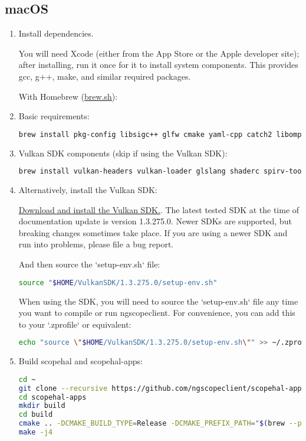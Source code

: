 \subsection{macOS}
\begin{enumerate}

\item Install dependencies.

You will need Xcode (either from the App Store or the Apple developer site); after installing, run it once for it
to install system components. This provides gcc, g++, make, and similar required packages.

With Homebrew (\href{https://brew.sh}{brew.sh}):

\item Basic requirements:
\begin{lstlisting}[language=sh, numbers=none]
brew install pkg-config libsigc++ glfw cmake yaml-cpp catch2 libomp hidapi libpng
\end{lstlisting}

\item Vulkan SDK components (skip if using the Vulkan SDK):
\begin{lstlisting}[language=sh, numbers=none]
brew install vulkan-headers vulkan-loader glslang shaderc spirv-tools molten-vk
\end{lstlisting}

\item Alternatively, install the Vulkan SDK:

 \href{https://vulkan.lunarg.com/sdk/home}{Download and install the Vulkan SDK.}.
The latest tested SDK at the time of documentation update is version 1.3.275.0. Newer SDKs are supported, but breaking
changes sometimes take place.
If you are using a newer SDK and run into problems, please file a bug report.

And then source the `setup-env.sh` file:
\begin{lstlisting}[language=sh, numbers=none]
source "$HOME/VulkanSDK/1.3.275.0/setup-env.sh"
\end{lstlisting}

When using the SDK, you will need to source the `setup-env.sh` file any time you want to compile or run ngscopeclient.
For convenience, you can add this to your `.zprofile` or equivalent:
\begin{lstlisting}[language=sh, numbers=none]
echo "source \"$HOME/VulkanSDK/1.3.275.0/setup-env.sh\"" >> ~/.zprofile
\end{lstlisting}

\item Build scopehal and scopehal-apps:

\begin{lstlisting}[language=sh, numbers=none]
cd ~
git clone --recursive https://github.com/ngscopeclient/scopehal-apps.git
cd scopehal-apps
mkdir build
cd build
cmake .. -DCMAKE_BUILD_TYPE=Release -DCMAKE_PREFIX_PATH="$(brew --prefix);$(brew --prefix)/opt/libomp"
make -j4
\end{lstlisting}

\end{enumerate}


